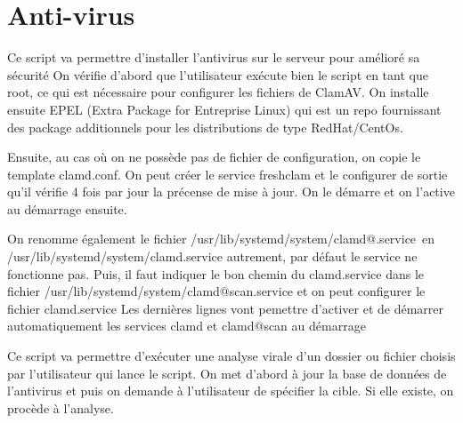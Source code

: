 \section{Anti-virus}

Ce script va permettre d’installer l’antivirus sur le serveur pour amélioré sa sécurité
On vérifie d’abord que l’utilisateur exécute bien le script en tant que root, ce qui est nécessaire pour configurer les fichiers de ClamAV.
On installe ensuite EPEL (Extra Package for Entreprise Linux) qui est un repo fournissant des package additionnels pour les distributions de type RedHat/CentOs.

Ensuite, au cas où on ne possède pas de fichier de configuration, on copie le template clamd.conf. On peut créer le service freshclam  et le configurer de sortie qu’il vérifie 4 fois par jour la précense de mise à jour. On le démarre et on l’active au démarrage ensuite.

On renomme également le fichier /usr/lib/systemd/system/clamd@.service en /usr/lib/systemd/system/clamd.service autrement, par défaut le service ne fonctionne pas. Puis, il faut indiquer le bon chemin du clamd.service dans le fichier /usr/lib/systemd/system/clamd@scan.service et on peut configurer le fichier clamd.service
Les dernières lignes vont pemettre d’activer et de démarrer automatiquement les services clamd et clamd@scan au démarrage



Ce script va permettre d’exécuter une analyse virale d’un dossier ou fichier choisis par l’utilisateur qui lance le script.
On met d’abord à jour la base de données de l’antivirus et puis on demande à l’utilisateur de spécifier la cible. Si elle existe, on procède à l’analyse.
